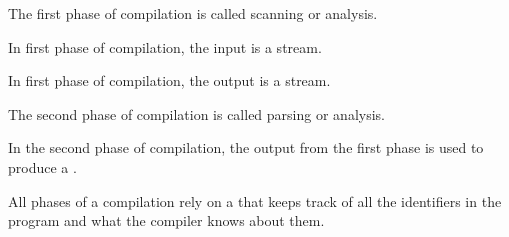 

\renewcommand\AUTHOR{nweadick1@cougars.ccis.edu} %


\topmattertwo

\nextq
The first phase of compilation is called scanning or 
 analysis.

\nextq
In first phase of compilation, the input is a  stream.

\nextq
In first phase of compilation, the output is a  stream.

\nextq
The second phase of compilation is called parsing or  analysis.

\nextq
In the second phase of compilation, the output from the first phase is used to produce a .

\nextq
All phases of a compilation rely on a  that keeps
track of all the identifiers in the program and what the
compiler knows about them.

\newpage




